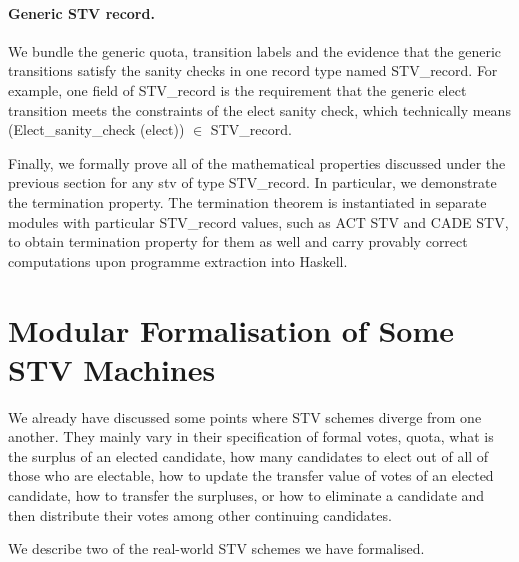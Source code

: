 \documentclass{llncs}
\begin{document}
\paragraph{Generic STV record.} We bundle the generic quota,  transition labels and the evidence that the generic transitions satisfy the sanity checks in one record type named {\selectfont STV\_record}. For example, one field of {\selectfont STV\_record} is the requirement that the generic elect transition meets the constraints of the elect sanity check, which technically means ({\selectfont Elect\_sanity\_check (elect)}) $\in$ {\selectfont STV\_record}. 


Finally, we formally prove all of the mathematical properties discussed under the previous section for any {\selectfont stv} of type {\selectfont STV\_record}. In particular, we demonstrate the termination property. The termination theorem is instantiated in separate modules with particular {\selectfont STV\_record} values, such as ACT STV and CADE STV, to obtain termination property for them as well and carry provably correct computations upon programme extraction into Haskell.
\section{Modular Formalisation of Some STV Machines}
We already have discussed some points where STV schemes diverge from one another. They mainly vary in their specification of formal votes, quota, what is the surplus of an elected candidate, how many candidates to elect out of all of those who are electable, how to update the transfer value of votes of an elected candidate, how to transfer the surpluses, or how to eliminate a candidate and then distribute their votes among other continuing candidates.

We describe two of the real-world STV schemes we have formalised. 
  
\end{document}
